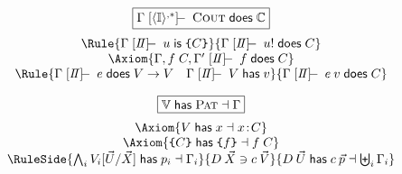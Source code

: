 \documentclass{article}
\begin{document}
\[\begin{array}{c}
\fbx{\Gamma \tns{\gb{\IT}{,*}} \cout \does \CT}
\medskip\\
\Rule{\Gamma \tns{\Is} u \is \sus{C}}
     {\Gamma \tns{\Is} u! \does C}
\\
\Axiom{\Gamma,f\doesc C,\Gamma' \tns{\Is} f \does C}
\\
\Rule{\Gamma \tns{\Is} e\does V\to V\quad \Gamma \tns{\Is} V \has v}
     {\Gamma \tns{\Is} e\:v \does C}
\end{array}\]

\[\begin{array}{c}
\fbx{\VT \has \pat \dashv \Gamma}
\medskip\\
\Axiom{V \has x \dashv x\isc C}
\\
\Axiom{\sus{C} \has \sus{f} \dashv f\doesc C}
\\
\RuleSide{\bigwedge_i V_i[\vec{U}/\vec{X}] \has p_i \dashv \Gamma_i}
         {D\:\vec{X} \ni c\:\vec{V}}
         {D\:\vec{U}\has c\:\vec{p} \dashv \biguplus_i\Gamma_i}
\end{array}\]
\end{document}
